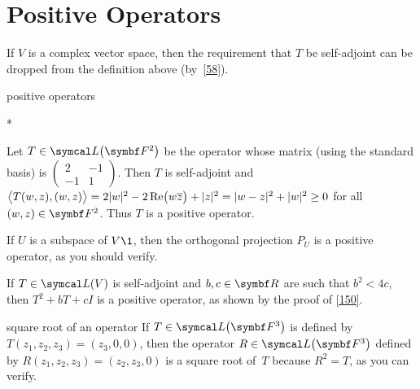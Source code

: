 \section{Positive Operators} \label{POIUO}


If $V$ is a complex vector space, then the requirement  that $T$ be self-adjoint can be dropped from the definition above (by~\ref{58}).

\begin{example}{positive operators}
\begin{subtheorem}*
\item
Let $T \in \L\paren[\big]{\F2}$ be the operator whose matrix (using the standard basis) is
$\left(\begin{smallmatrix}2 & -1\\-1 & 1\end{smallmatrix}\right)$.
Then $T$ is self-adjoint and $\ip[\big]{T(w, z), (w, z)} = 2 \abs{w}^2 - 2\re\paren[\big]{w\overline{z}} + \abs{z}^2 \linebreak[2]= \abs{w-z}^2 + \abs{w}^2 \ge 0$ for all
$(w, z) \in \F2$.
Thus $T$ is a positive operator.
\item
If $U$ is a subspace of $V\1$, then the orthogonal projection $P_{\!U}$ is a positive operator, as you should verify.
\item
If $T \in \L(V)$ is self-adjoint and $b, c \in \R{}$ are such that
$b^2 < 4 c$, then $T^2 + b T + c I$ is a positive operator, as shown by the proof of \ref{150}.
\end{subtheorem}
\vspace{-.1in}
\end{example}


\begin{example}{square root of an operator}
If $T \in \L\paren[\big]{\F{3}}$ is defined by $T(z_1, z_2, z_3) = (z_3, 0, 0)$, then
the operator \mbox{$R \in \L\paren[\big]{\F{3}}$} defined by $R(z_1, z_2, z_3) = (z_2, z_3, 0)$
is a square root of~$T$ because $R^2 = T$, as you can verify.
\end{example}

